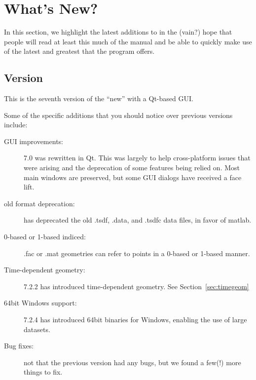\section{What's New?}
\label{sec:new-features} 

In this section, we highlight the latest additions to \map{} in the
(vain?) hope that people will read at least this much of the manual
and be able to quickly make use of the latest and greatest that the program
offers.

\subsection{Version~\version{}}

This is the seventh version of the ``new'' \map{} with a Qt-based GUI.

Some of the specific additions that you should notice over previous versions
include:
%
\begin{description}
  \item [GUI improvements: ] \map{} 7.0 was rewritten in Qt.
    This was largely to help cross-platform issues that were
    arising and the deprecation of some features being relied
    on.
    Most main windows are preserved, but some GUI dialogs have
    received a face lift.
  \item [old format deprecation: ] \map{} has deprecated the old .tsdf, .data, and .tsdfc data files, in favor of matlab.
  \item [0-based or 1-based indiced: ] .fac or .mat geometries can refer to points in a 0-based or 1-based manner.
  \item [Time-dependent geometry: ] \map{} 7.2.2 has introduced time-dependent geometry.  See Section~\ref{sec:timegeom}
  \item [64bit Windows support: ] \map{} 7.2.4 has introduced 64bit binaries for Windows, enabling the use of large datasets.
  \item [Bug fixes: ] not that the previous version had any bugs, but we
    found a few(!) more things to fix.
\end{description}

